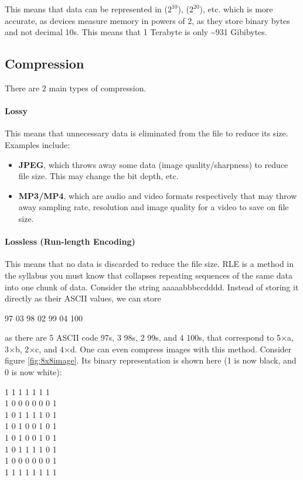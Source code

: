 \documentclass[../main.tex]{subfiles}
\begin{document}
This means that data can be represented in ($2^{10}$), ($2^{20}$), etc. which is more accurate, as devices measure memory in powers of 2, as they store binary bytes and not decimal 10s. This means that 1 Terabyte is only \textasciitilde931 Gibibytes.

\subsection{Compression}

There are 2 main types of compression.

\paragraph{Lossy}

This means that unnecessary data is eliminated from the file to reduce its size. Examples include:

\begin{itemize}
    \item \textbf{JPEG}, which throws away some data (image quality/sharpness) to reduce file size. This may change the bit depth, etc.
    \item \textbf{MP3/MP4}, which are audio and video formats respectively that may throw away sampling rate, resolution and image quality for a video to save on file size. 
\end{itemize}

\paragraph{Lossless (Run-length Encoding)}

This means that no data is discarded to reduce the file size. RLE is a method in the syllabus you must know that collapses repeating sequences of the same data into one chunk of data. Consider the string {\ccmono aaaaabbbccdddd}. Instead of storing it directly as their ASCII values, we can store

{\centering{} 97 03 98 02 99 04 100
\medskip}

as there are 5 ASCII code 97s, 3 98s, 2 99s, and 4 100s, that correspond to 5×a, 3×b, 2×c, and 4×d. One can even compress images with this method. Consider figure \ref{fig:8x8image}. Its binary representation is shown here (1 is now black, and 0 is now white):

{ 1 1 1 1 1 1 1\\
    1 0 0 0 0 0 0 1\\
    1 0 1 1 1 1 0 1\\
    1 0 1 0 0 1 0 1\\
    1 0 1 0 0 1 0 1\\
    1 0 1 1 1 1 0 1\\
    1 0 0 0 0 0 0 1\\
    1 1 1 1 1 1 1 1\\
\medskip}
\end{document}
